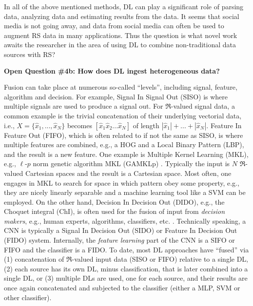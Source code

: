 \documentclass[12pt]{spieman}
\newcommand{\ParSection}[1]{}
\begin{document}
\begin{spacing}{1}
In all of the above mentioned methods, DL can play a significant role of parsing data, analyzing data and estimating results from the data. It seems that social media is not going away, and data from social media can often be used to augment RS data in many applications. Thus the question is what novel work awaits the researcher in the area of using DL to combine non-traditional data sources with RS?

\ParSection{Data Fusion}
\textbf{Open Question \#4b: How does DL ingest heterogeneous data?}

Fusion can take place at numerous so-called ``levels'', including signal, feature, algorithm and decision. For example, Signal In Signal Out (SISO) is where multiple signals are used to produce a signal out. For $\Re$-valued signal data, a common example is the trivial concatenation of their underlying vectorial data, i.e., $X=\{ \hat{x}_1, ... , \hat{x}_N \}$ becomes $[ \hat{x}_1 \hat{x}_2 ... \hat{x}_N ]$ of length $|\hat{x}_1|+...+|\hat{x}_N|$. Feature In Feature Out (FIFO), which is often related to if not the same as SISO, is where multiple features are combined, e.g., a HOG and a Local Binary Pattern (LBP), and the result is a new feature. One example is Multiple Kernel Learning (MKL), e.g., $\ell$-$p$ norm genetic algorithm MKL (GAMKLp) \cite{7762088} . Typically the input is $N$ $\Re$-valued Cartesian spaces and the result is a Cartesian space. Most often, one engages in MKL to search for space in which pattern obey some property, e.g., they are nicely linearly separable and a machine learning tool like a SVM can be employed. On the other hand, Decision In Decision Out (DIDO), e.g., the Choquet integral (ChI), is often used for the fusion of input from \emph{decision makers}, e.g., human experts, algorithms, classifiers, etc. \cite{6722924}. Technically speaking, a CNN is typically a Signal In Decision Out (SIDO) or Feature In Decision Out (FIDO) system. Internally, the \emph{feature learning} part of the CNN is a SIFO or FIFO and the classifier is a FIDO. To date, most DL approaches have ``fused'' via (1) concatenation of $\Re$-valued input data (SISO or FIFO) relative to a single DL, (2) each source has its own DL, minus classification, that is later combined into a single DL, or (3) multiple DLs are used, one for each source, and their results are once again concatenated and subjected to the classifier (either a MLP, SVM or other classifier).


\end{spacing}
\end{document}
